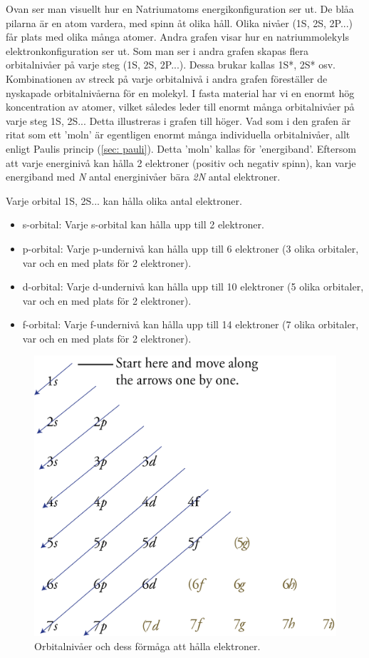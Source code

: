 Ovan ser man visuellt hur en Natriumatoms energikonfiguration ser ut. De blåa pilarna är en atom vardera, med spinn åt olika håll. Olika nivåer (1S, 2S, 2P...) får plats med olika många atomer. Andra grafen visar hur en natriummolekyls elektronkonfiguration ser ut. Som man ser i andra grafen skapas flera orbitalnivåer på varje steg (1S, 2S, 2P...). Dessa brukar kallas 1S*, 2S* osv. Kombinationen av streck på varje orbitalnivå i andra grafen föreställer de nyskapade orbitalnivåerna för en molekyl. I fasta material har vi en enormt hög koncentration av atomer, vilket således leder till enormt många orbitalnivåer på varje steg 1S, 2S... Detta illustreras i grafen till höger. Vad som i den grafen är ritat som ett 'moln' är egentligen enormt många individuella orbitalnivåer, allt enligt Paulis princip (\ref{sec: pauli}). Detta 'moln' kallas för 'energiband'. Eftersom att varje energinivå kan hålla 2 elektroner (positiv och negativ spinn), kan varje energiband med \textit{N} antal energinivåer bära \textit{2N} antal elektroner.

Varje orbital 1S, 2S... kan hålla olika antal elektroner. 
\begin{itemize}
    \item s-orbital: Varje s-orbital kan hålla upp till 2 elektroner.
    \item p-orbital: Varje p-undernivå kan hålla upp till 6 elektroner (3 olika orbitaler, var och en med plats för 2 elektroner).
    \item d-orbital: Varje d-undernivå kan hålla upp till 10 elektroner (5 olika orbitaler, var och en med plats för 2 elektroner).
    \item f-orbital: Varje f-undernivå kan hålla upp till 14 elektroner (7 olika orbitaler, var och en med plats för 2 elektroner).
\end{itemize}

\begin{figure}[ht]
    \centering
    \includegraphics{bilder/fig:elektronkonfig.png}
    \caption{Orbitalnivåer och dess förmåga att hålla elektroner.}
    \label{fig:orbitalnivåer}
\end{figure}

